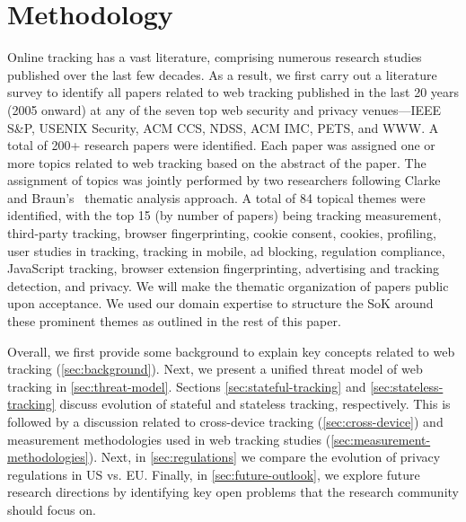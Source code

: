 \section{Methodology}
\label{sec:methodology}

Online tracking has a vast literature, comprising numerous research studies published over the last few decades.
%
As a result, we first carry out a literature survey to identify all papers related to web tracking published in the last 20 years (2005 onward) at any of the seven top web security and privacy venues---IEEE S\&P, USENIX Security, ACM CCS, NDSS, ACM IMC, PETS, and WWW.
%
A total of 200+ research papers were identified. 
%
Each paper was assigned one or more topics related to web tracking based on the abstract of the paper.
%
The assignment of topics was jointly performed by two researchers following Clarke and Braun’s~\cite{clarke2013successful} thematic analysis approach.
%
A total of 84 topical themes were identified, with the top 15 (by number of papers) being tracking measurement, third-party tracking, browser fingerprinting, cookie consent, cookies, profiling, user studies in tracking, tracking in mobile, ad blocking, regulation compliance, JavaScript tracking, browser extension fingerprinting, advertising and tracking detection, and privacy.
%
We will make the thematic organization of papers public upon acceptance.
%
We used our domain expertise to structure the SoK around these prominent themes as outlined in the rest of this paper. 


Overall, we first provide some background to explain key concepts related to web tracking (\autoref{sec:background}). 
%
Next, we present a unified threat model of web tracking in \autoref{sec:threat-model}. Sections \ref{sec:stateful-tracking} and \ref{sec:stateless-tracking} discuss evolution of stateful and stateless tracking, respectively. 
%
This is followed by a discussion related to cross-device tracking (\autoref{sec:cross-device}) and measurement methodologies used in web tracking studies (\autoref{sec:measurement-methodologies}). 
%
Next, in \autoref{sec:regulations} we compare the evolution of privacy regulations in US vs. EU. 
%
Finally, in \autoref{sec:future-outlook}, we explore future research directions by identifying key open problems that the research community should focus on.
